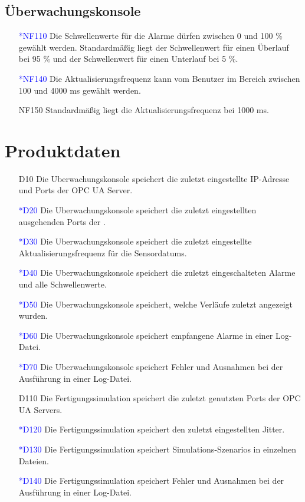 \documentclass[parskip=full]{scrartcl}
\begin{document}
\subsection{Überwachungskonsole}
\begin{enumerate}
  \item[\textcolor{blue}{*NF110}] Die Schwellenwerte für die Alarme dürfen zwischen 0 und 100 \% gewählt werden. Standardmäßig liegt der Schwellenwert für einen Überlauf bei
  95 \% und der Schwellenwert für einen Unterlauf bei 5 \%.
  \item[\textcolor{blue}{*NF140}] Die Aktualisierungsfrequenz kann vom Benutzer im Bereich zwischen 100 und 4000 ms gewählt werden.
  \item[NF150] Standardmäßig liegt die Aktualisierungsfrequenz bei 1000 ms.
\end{enumerate}

\pagebreak
\section{Produktdaten}
\begin{enumerate}
  \item[D10] Die \gls{Uberwachungskonsole} speichert die zuletzt eingestellte IP-Adresse und Ports der \gls{OPC UA Server}.
  \item[\textcolor{blue}{*D20}] Die \gls{Uberwachungskonsole} speichert die zuletzt eingestellten ausgehenden Ports der .
  \item[\textcolor{blue}{*D30}] Die \gls{Uberwachungskonsole} speichert die zuletzt eingestellte Aktualisierungsfrequenz für die \glspl{Sensordatum}.
  \item[\textcolor{blue}{*D40}] Die \gls{Uberwachungskonsole} speichert die zuletzt eingeschalteten Alarme und alle Schwellenwerte.
  \item[\textcolor{blue}{*D50}] Die \gls{Uberwachungskonsole} speichert, welche Verläufe zuletzt angezeigt wurden.
  \item[\textcolor{blue}{*D60}] Die \gls{Uberwachungskonsole} speichert empfangene Alarme in einer Log-Datei.
  \item[\textcolor{blue}{*D70}] Die \gls{Uberwachungskonsole} speichert Fehler und Ausnahmen bei der Ausführung in einer Log-Datei.
  \item[D110] Die \gls{Fertigungssimulation} speichert die zuletzt genutzten Ports der \glspl{OPC UA Server}.
  \item[\textcolor{blue}{*D120}] Die \gls{Fertigungssimulation} speichert den zuletzt eingestellten \gls{Jitter}.
  \item[\textcolor{blue}{*D130}] Die \gls{Fertigungssimulation} speichert \glspl{Simulations-Szenario} in einzelnen Dateien.
  \item[\textcolor{blue}{*D140}] Die \gls{Fertigungssimulation} speichert Fehler und Ausnahmen bei der Ausführung in einer Log-Datei.
\end{enumerate}
\end{document}
